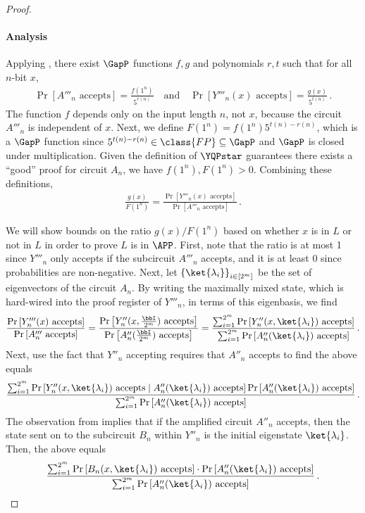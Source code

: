 \begin{proof}
	\paragraph{Analysis}
	Applying , there exist $\GapP$ functions $f,g$ and polynomials
	$r,t$ such that for all $n$-bit $x$,
	\begin{gather*}
		\Pr\left[A'''_n\text{ accepts}\right] = \frac{f(1^n)}{5^{r(n)}}
		\quad\text{and}\quad
		\Pr\left[Y'''_n(x)\text{ accepts}\right] = \frac{g(x)}{5^{t(n)}} \, .
	\end{gather*}
	The function $f$ depends only on the input length $n$, not $x$,
	because the circuit $A'''_n$ is independent of $x$.
	Next, we define $F(1^n) = f(1^n) 5^{t(n)-r(n)}$, which is a $\GapP$ function
	since $5^{t(n)-r(n)}\in \class{FP}\subseteq \GapP$ and $\GapP$ is closed under
	multiplication.
	Given the definition of $\YQPstar$ guarantees there
	exists a ``good'' proof for circuit $A_n$,
	we have  $f(1^n),F(1^n)>0$.
	Combining these definitions,
	\begin{gather*}
		\frac{g(x)}{F(1^n)} =
		\frac{\Pr\left[Y'''_n(x)\text{ accepts}\right]}
		{\Pr\left[A'''_n\text{ accepts}\right] } \, .
	\end{gather*}
	
	We will show bounds on the ratio $g(x)/F(1^n)$ based on whether $x$ is in $L$ or
	not in $L$ in order to prove $L$ is in $\APP$.
	First, note that the ratio is
 at most %
 1 since $Y'''_n$ only accepts if the subcircuit $A'''_n$ accepts,
 and it is %
 at least %
0 since probabilities are non-negative.
	Next, let $\left\{\ket{\lambda_i}\right\}_{i\in[2^m]}$ be the set of
	eigenvectors of the circuit $A_n$.
	By writing the maximally mixed state, which is hard-wired into the proof register of
	$Y'''_n$,
	in terms of this eigenbasis, we find
	\[
		\frac{\Pr\left[Y'''_n(x)\text{ accepts}\right]}
		{\Pr\left[A'''_n\text{ accepts}\right]}
		= \frac{\Pr\left[Y''_n(x,\frac{\bbI}{2^m})\text{ accepts}\right]}
		{\Pr\left[A''_n(\frac{\bbI}{2^m})\text{ accepts}\right]}
		= \frac{\sum_{i=1}^{2^{m}}
			\Pr\left[Y''_n(x,\ket{\lambda_i})\text{ accepts}\right]}
		{\sum_{i=1}^{2^{m}} \Pr\left[A''_n(\ket{\lambda_i})
			\text{ accepts}\right]} \, .
	\]
	Next, use the fact that $Y''_n$ accepting requires that
	$A''_n$ accepts to find the above equals
	\[
		\frac{\sum_{i=1}^{2^{m}}
		\Pr\left[Y''_n(x,\ket{\lambda_i})\text{ accepts}
		\mid A''_n(\ket{\lambda_i})\text{ accepts} \right]
		\Pr\left[A''_n(\ket{\lambda_i})\text{ accepts}\right]}
		{\sum_{i=1}^{2^{m}} \Pr\left[A''_n(\ket{\lambda_i})
		\text{ accepts}\right]}  \, .
	\]
	The observation from 
	implies	that if the amplified circuit $A''_n$ %
	accepts, then %
	the state sent on to the subcircuit $B_n$ within $Y''_n$ is 
the initial eigenstate $\ket{\lambda_i}$.
	Then, the above equals
	\[
		\frac{\sum_{i=1}^{2^{m}}
			\Pr\left[B_n(x,\ket{\lambda_i})\text{ accepts}\right]
			\cdot \Pr\left[A''_n(\ket{\lambda_i})\text{ accepts}\right]}
		{\sum_{i=1}^{2^{m}} \Pr\left[A''_n(\ket{\lambda_i})
			\text{ accepts}\right]} \, .
	\]


\end{proof}
